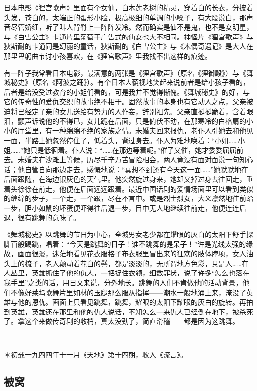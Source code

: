 \par 日本电影《狸宫歌声》里面有个女仙，白木莲老树的精灵，穿着白的长衣，分披着头发，苍白的，太端正的蛋形小脸，极高极细的单调的小嗓子，有大段说白，那声音尽管娇细，听了叫人背脊上一阵阵发冷。然而确实是仙不是鬼，也不是女明星，与《白雪公主》卡通片里葡萄干广告式的仙女也大不相同。神怪片《狸宫歌声》与狄斯耐的卡通同是幻丽的童话，狄斯耐的《白雪公主》与《木偶奇遇记》是大人在那里卑躬曲节讨小孩喜欢，在《狸宫歌声》里我找不出这样的痕迹。
\par 有一阵子我常看日本电影，最满意的两张是《狸宫歌声》（原名《狸御殿》）与《舞城秘史》（原名《阿波之踊》）。有个日本人藐视地笑起来说前者是给小孩子看的，后者是给没受过教育的小姐们看的，可是我并不觉得惭愧。《舞城秘史》的好，与它的传奇性的爱仇交织的故事绝不相干。固然故事的本身也有它动人之点，父亲被迫将已经定了亲的女儿送给有势力的人作妾，辞别祖先。父亲直挺挺跪着，含着眼泪，颤声诉说他的不得已，女儿跪在后面，只是俯伏不动，在那寒冷的白格扇的小小的厅堂里，有一种绵绵不绝的家族之情。未婚夫回来报仇，老仆人引她去和他见一面，半路上她忽然停住了，低着头，背过身去。仆人为难地唤着：“小姐……小姐……”她只是低徊着。仆人说：“……在那边等着呢。”催了又催，她才委委屈屈前去。未婚夫在沙滩上等候，历尽千辛万苦冒险相会，两人竟没有面对面说一句知心话；他自管自向那边走去，感慨地说：“真想不到还有今天这一面……”她默默地在后面跟随，在海边银灰色的天气里。他突然旋过身来，她却又掉过身去往回走，垂着头徐徐在前走，他便在后面远远跟着。最近中国话剧的爱情场面里可以看到类似的缠绵的步子，一个走，一个跟，尽在不言中。或是烈士烈女，大义凛然地往前踏一步，胆小如鼠的坏蛋便吓得往后退一步，目中无人地继续往前走，他便连连后退，很有跳舞的意味了。
\par 《舞城秘史》以跳舞的节日为中心，全城男女老少都在耀眼的灰白的太阳下舒手探脚百般踢跳，唱着：“今天是跳舞的日子！谁不跳舞的是呆子！”许是光线太强的缘故，画面很淡，迷茫地看见花衣服格子布衣服里冒出来的狂欢的肢体脖项，女人油头上的梳子，老人颠动着花白的髻，都是淡淡的，无所谓地方色彩，只是人……在人丛里，英雄抓住了他的仇人，一把捉住衣领，细数罪状，说了许多“怎么也落在我手里”之类的话，用日文来说，分外地长。跳舞的人们不肯做他的活动背景，他们不像好莱坞歌舞片里如林的玉腿那么服从指挥——潮水一般地涌上来，淹没了英雄与他的恩仇。画面上只看见跳舞，跳舞，耀眼的太阳下耀眼的灰白的旋转。再拍到英雄，英雄还在那里和他的仇人说话，不知怎么一来仇人已经倒在地下，被杀死了。拿这个来做传奇剧的收梢，真太没劲了，简直滑稽——都是因为这跳舞。
\par  
\par ＊初载一九四四年十一月《天地》第十四期，收入《流言》。


\subsection{被窝}

